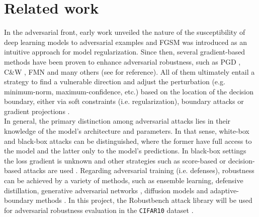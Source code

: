 
\section{Related work}

In the adversarial front, early work 
\cite{szegedyIntriguingPropertiesNeural2014}
unveiled the nature of the susceptibility of deep learning 
models to adversarial examples and FGSM 
\cite{goodfellowExplainingHarnessingAdversarial2015}
was introduced as an intuitive
approach for model regularization. 
Since then, several gradient-based methods have been
proven to enhance adversarial robustness, such as PGD
\cite{madryDeepLearningModels2019}, C\&W 
\cite{carliniEvaluatingRobustnessNeural2017},
FMN
\cite{pintorFastMinimumnormAdversarial2021} and
many others (see 
\cite{liReviewAdversarialAttack2022} for reference). 
All of them ultimately entail a strategy to find
a vulnerable direction and adjust the perturbation 
(e.g. minimum-norm, maximum-confidence, etc.)
based on the location of the decision boundary, either via soft
constraints (i.e. regularization), boundary attacks or gradient
projections
\cite{baiRecentAdvancesAdversarial2021}. \\

In general, the primary distinction among adversarial attacks lies in
their knowledge of the model's architecture and parameters. In that
sense, white-box and black-box
attacks can be distinguished, where the former have full 
access to the model and the latter only 
to the model's predictions. In black-box settings the loss gradient
is unknown and other strategies such as score-based or
decision-based attacks are used
\cite{liReviewAdversarialAttack2022}. Regarding adversarial training (i.e. defenses), 
robustness can
be achieved by a variety of methods, 
such as ensemble learning,
defensive distillation,
generative adversarial networks
\cite{xiaoGeneratingAdversarialExamples2019, miyatoVirtualAdversarialTraining2018},
diffusion models
\cite{wangBetterDiffusionModels2023,hoDenoisingDiffusionProbabilistic2020}
and adaptive-boundary methods
\cite{cohenCertifiedAdversarialRobustness2019}.
In this project, the Robustbench attack library
\cite{croceRobustBenchStandardizedAdversarial2021a}
will be used for adversarial robustness evaluation 
in the \texttt{CIFAR10} dataset
\cite{krizhevskyLearningMultipleLayers}. \\


